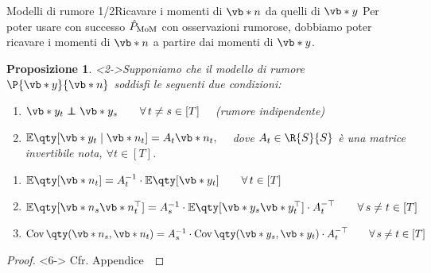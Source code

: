 \documentclass[10pt,xcolor={table,dvipsnames}]{beamer} 		%
\theoremstyle{plain}					%
\newtheorem{proposizione}{Proposizione}%
\theoremstyle{definition}
\theoremstyle{remark}
\newcommand{\transpose}[1]{#1^{\top}}
\newcommand{\Cov}[1]{\operatorname{Cov}\qty(#1)}
\newcommand\independent{\protect\mathpalette{\protect\independenT}{\perp}}
\def\independenT#1#2{\mathrel{\rlap{$#1#2$}\mkern2mu{#1#2}}}
\begin{document}
	\begin{frame}
		{\hypertarget{frame:prop_noise_model}{Modelli di rumore 1/2}}{Ricavare i momenti di $\vb*{n}$ da quelli di $\vb*{y}$}
		Per poter usare con successo $\hat{P}_{\textup{MoM}}$ con osservazioni rumorose,
		dobbiamo poter ricavare i momenti di $\vb*{n}$ a partire dai momenti di $\vb*{y}$.

		
		\begin{proposizione}<2->\label{prop:noise_model}
			Supponiamo che il modello di rumore $\P{\vb*{y}}{\vb*{n}}$ soddisfi le seguenti
			due condizioni:
			\begin{enumerate}
				\item<2-> $\vb*{y}_t\independent\vb*{y}_s\qquad\forall\,t\ne s\in[T]\quad$ {\smaller (rumore indipendente)}
				\item<3-> $\mathbb{E}\qty[\vb*{y}_t\mid\vb*{n}_t]=A_t\vb*{n}_t,\quad$ dove $A_t\in\R{S}{S}$ è una 
				matrice \emph{invertibile} nota, $\forall t\in[T]$.
			\end{enumerate}
			\begin{enumerate}
				\item<5-> $\mathbb{E}\qty[\vb*{n}_t]=A_t^{-1}\cdot\mathbb{E}\qty[\vb*{y}_t]\qquad\forall\,t\in[T]$
				\item<5-> $\mathbb{E}\qty[\vb*{n}_s\transpose{\vb*{n}_t}]=A_s^{-1}\cdot\mathbb{E}\qty[\vb*{y}_s\transpose{\vb*{y}_t}]\cdot{A_t^{-\top}}\qquad\forall\,s\ne t\in[T]$
				\item<5-> $\Cov{\vb*{n}_s,\vb*{n}_t}=A_s^{-1}\cdot\Cov{\vb*{y}_s,\vb*{y}_t}\cdot{A_t^{-\top}}\qquad\forall\,s\ne t\in[T]$
			\end{enumerate}
		\end{proposizione}
		\begin{proof}<6->
			Cfr. Appendice~\hyperlink{frame:dim_prop_noise_model:appendice}{\faHandPointRight}
		\end{proof}
	\end{frame}
\end{document}
